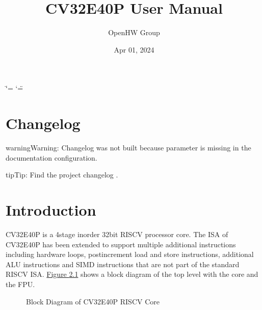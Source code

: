 \documentclass[letterpaper,10pt,english]{sphinxmanual}
\title{CV32E40P User Manual}
\date{Apr 01, 2024}
\author{OpenHW Group}
\begin{document}
\ifdefined\shorthandoff
  \ifnum\catcode`\=\string=\active\shorthandoff{=}\fi
  \ifnum\catcode`\"=\active{}\fi
\fi

\pagestyle{empty}
\sphinxmaketitle
\pagestyle{plain}
\sphinxtableofcontents
\pagestyle{normal}
\label{\detokenize{index::doc}}


\sphinxstepscope


\chapter{Changelog}
\label{\detokenize{preface:changelog}}\label{\detokenize{preface::doc}}
\begin{sphinxadmonition}{warning}{Warning:}
\sphinxAtStartPar
Changelog was not built because  parameter is missing in the documentation configuration.
\end{sphinxadmonition}

\begin{sphinxadmonition}{tip}{Tip:}
\sphinxAtStartPar
Find the project changelog .
\end{sphinxadmonition}

\sphinxstepscope


\chapter{Introduction}
\label{\detokenize{intro:introduction}}\label{\detokenize{intro::doc}}
\sphinxAtStartPar
CV32E40P is a 4\sphinxhyphen{}stage in\sphinxhyphen{}order 32\sphinxhyphen{}bit RISC\sphinxhyphen{}V
processor core. The ISA of CV32E40P
has been extended to support multiple additional instructions including
hardware loops, post\sphinxhyphen{}increment load and store instructions,
additional ALU instructions and SIMD instructions that are not part of the standard RISC\sphinxhyphen{}V
ISA. \hyperref[\detokenize{intro:blockdiagram}]{Figure \ref{\detokenize{intro:blockdiagram}}} shows a block diagram of the top level with the core and the FPU.

\begin{figure}[htbp]
\centering
\capstart

\noindent{}
\caption{Block Diagram of CV32E40P RISC\sphinxhyphen{}V Core}\label{\detokenize{intro:blockdiagram}}\end{figure}
\end{document}
